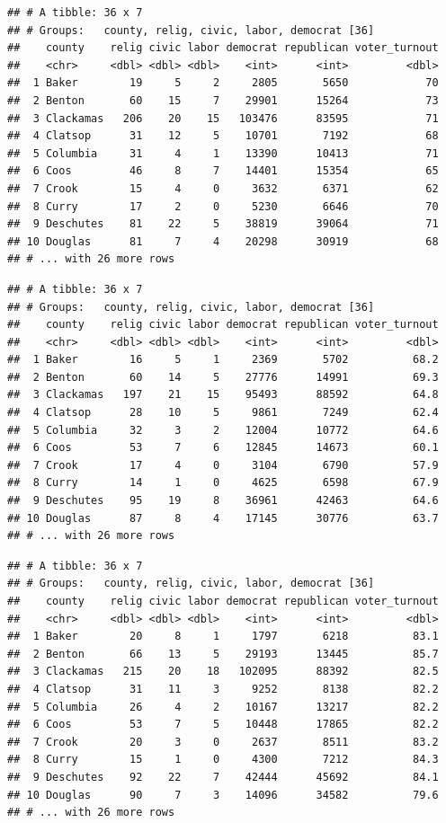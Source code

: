 \documentclass[
  english,
  man]{apa6}
\begin{document}
\begin{verbatim}
## # A tibble: 36 x 7
## # Groups:   county, relig, civic, labor, democrat [36]
##    county    relig civic labor democrat republican voter_turnout
##    <chr>     <dbl> <dbl> <dbl>    <int>      <int>         <dbl>
##  1 Baker        19     5     2     2805       5650            70
##  2 Benton       60    15     7    29901      15264            73
##  3 Clackamas   206    20    15   103476      83595            71
##  4 Clatsop      31    12     5    10701       7192            68
##  5 Columbia     31     4     1    13390      10413            71
##  6 Coos         46     8     7    14401      15354            65
##  7 Crook        15     4     0     3632       6371            62
##  8 Curry        17     2     0     5230       6646            70
##  9 Deschutes    81    22     5    38819      39064            71
## 10 Douglas      81     7     4    20298      30919            68
## # ... with 26 more rows
\end{verbatim}

\begin{verbatim}
## # A tibble: 36 x 7
## # Groups:   county, relig, civic, labor, democrat [36]
##    county    relig civic labor democrat republican voter_turnout
##    <chr>     <dbl> <dbl> <dbl>    <int>      <int>         <dbl>
##  1 Baker        16     5     1     2369       5702          68.2
##  2 Benton       60    14     5    27776      14991          69.3
##  3 Clackamas   197    21    15    95493      88592          64.8
##  4 Clatsop      28    10     5     9861       7249          62.4
##  5 Columbia     32     3     2    12004      10772          64.6
##  6 Coos         53     7     6    12845      14673          60.1
##  7 Crook        17     4     0     3104       6790          57.9
##  8 Curry        14     1     0     4625       6598          67.9
##  9 Deschutes    95    19     8    36961      42463          64.6
## 10 Douglas      87     8     4    17145      30776          63.7
## # ... with 26 more rows
\end{verbatim}

\begin{verbatim}
## # A tibble: 36 x 7
## # Groups:   county, relig, civic, labor, democrat [36]
##    county    relig civic labor democrat republican voter_turnout
##    <chr>     <dbl> <dbl> <dbl>    <int>      <int>         <dbl>
##  1 Baker        20     8     1     1797       6218          83.1
##  2 Benton       66    13     5    29193      13445          85.7
##  3 Clackamas   215    20    18   102095      88392          82.5
##  4 Clatsop      31    11     3     9252       8138          82.2
##  5 Columbia     26     4     2    10167      13217          82.2
##  6 Coos         53     7     5    10448      17865          82.2
##  7 Crook        20     3     0     2637       8511          83.2
##  8 Curry        15     1     0     4300       7212          84.3
##  9 Deschutes    92    22     7    42444      45692          84.1
## 10 Douglas      90     7     3    14096      34582          79.6
## # ... with 26 more rows
\end{verbatim}
\end{document}
